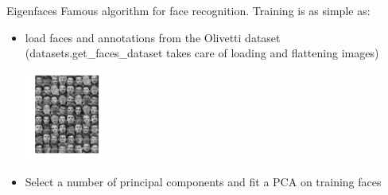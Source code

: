 \begin{frame}{Eigenfaces}
Famous algorithm for face recognition. Training is as simple as:
\begin{itemize}
\item load faces and annotations from the Olivetti dataset (datasets.get\_faces\_dataset takes care of loading and flattening images)\\
\begin{center}
\includegraphics[width=0.2\textwidth]{img/eigenfaces/olivetti.pdf}
\end{center}
\item Select a number of principal components and fit a PCA on training faces 
\end{itemize}
\end{frame}